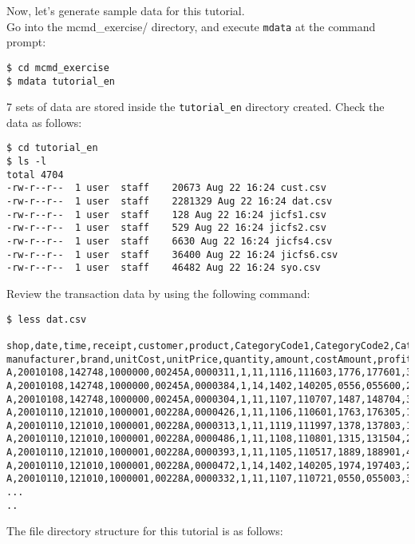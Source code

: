 Now, let's generate sample data for this tutorial. \\

Go into the mcmd\_exercise/ directory, and execute \verb|mdata| at the command prompt: \\

\begin{verbatim}
$ cd mcmd_exercise
$ mdata tutorial_en
\end{verbatim}

7 sets of data are stored inside the \verb|tutorial_en| directory created. Check the data as follows: \\
\begin{verbatim}
$ cd tutorial_en
$ ls -l 
total 4704
-rw-r--r--  1 user  staff    20673 Aug 22 16:24 cust.csv
-rw-r--r--  1 user  staff    2281329 Aug 22 16:24 dat.csv
-rw-r--r--  1 user  staff    128 Aug 22 16:24 jicfs1.csv
-rw-r--r--  1 user  staff    529 Aug 22 16:24 jicfs2.csv
-rw-r--r--  1 user  staff    6630 Aug 22 16:24 jicfs4.csv
-rw-r--r--  1 user  staff    36400 Aug 22 16:24 jicfs6.csv
-rw-r--r--  1 user  staff    46482 Aug 22 16:24 syo.csv
\end{verbatim}
 
Review the transaction data by using the following command: \\
\begin{verbatim}
$ less dat.csv

shop,date,time,receipt,customer,product,CategoryCode1,CategoryCode2,CategoryCode4,CategoryCode6,
manufacturer,brand,unitCost,unitPrice,quantity,amount,costAmount,profit
A,20010108,142748,1000000,00245A,0000311,1,11,1116,111603,1776,177601,339,441,1,441,339,102
A,20010108,142748,1000000,00245A,0000384,1,14,1402,140205,0556,055600,286,372,1,372,286,86
A,20010108,142748,1000000,00245A,0000304,1,11,1107,110707,1487,148704,343,446,1,446,343,103
A,20010110,121010,1000001,00228A,0000426,1,11,1106,110601,1763,176305,177,231,5,1155,885,270
A,20010110,121010,1000001,00228A,0000313,1,11,1119,111997,1378,137803,185,241,6,1446,1110,336
A,20010110,121010,1000001,00228A,0000486,1,11,1108,110801,1315,131504,208,271,1,271,208,63
A,20010110,121010,1000001,00228A,0000393,1,11,1105,110517,1889,188901,410,533,6,3198,2460,738
A,20010110,121010,1000001,00228A,0000472,1,14,1402,140205,1974,197403,267,348,1,348,267,81
A,20010110,121010,1000001,00228A,0000332,1,11,1107,110721,0550,055003,354,461,1,461,354,107
...
..
\end{verbatim}

The file directory structure for this tutorial is as follows: \\

